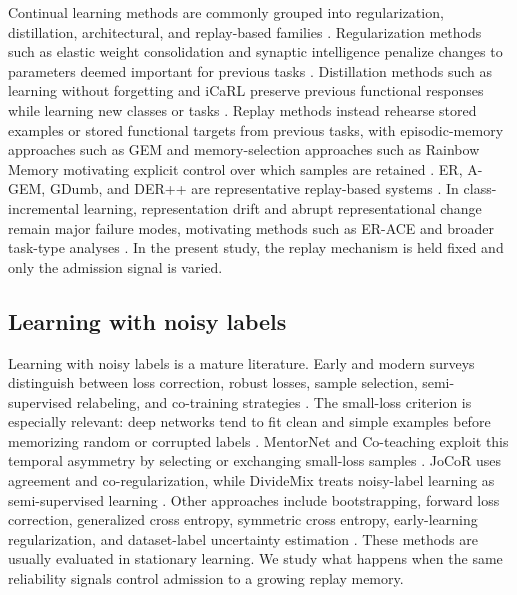 \documentclass[preprint,12pt]{elsarticle}
\begin{document}
Continual learning methods are commonly grouped into regularization, distillation, architectural, and replay-based families \cite{DeLange2022ContinualSurvey,Parisi2019ContinualReview,Wang2024ComprehensiveCLSurvey}. Regularization methods such as elastic weight consolidation and synaptic intelligence penalize changes to parameters deemed important for previous tasks \cite{Kirkpatrick2017EWC,Zenke2017SI}. Distillation methods such as learning without forgetting and iCaRL preserve previous functional responses while learning new classes or tasks \cite{Li2018LwF,Rebuffi2017iCaRL}. Replay methods instead rehearse stored examples or stored functional targets from previous tasks, with episodic-memory approaches such as GEM and memory-selection approaches such as Rainbow Memory motivating explicit control over which samples are retained \cite{LopezPaz2017GEM,Bang2021RainbowMemory}. ER, A-GEM, GDumb, and DER++ are representative replay-based systems \cite{Rolnick2019ExperienceReplay,Chaudhry2019AGEM,Prabhu2020GDumb,Buzzega2020DERPP}. In class-incremental learning, representation drift and abrupt representational change remain major failure modes, motivating methods such as ER-ACE and broader task-type analyses \cite{Caccia2022AbruptRepresentationChange,Masana2023ClassIncrementalSurvey,VanDeVen2022ThreeTypes}. In the present study, the replay mechanism is held fixed and only the admission signal is varied.

\subsection{Learning with noisy labels}

Learning with noisy labels is a mature literature. Early and modern surveys distinguish between loss correction, robust losses, sample selection, semi-supervised relabeling, and co-training strategies \cite{Frenay2014LabelNoiseSurvey,Algan2021NoisyLabelsSurvey,Song2023NoisyLabelsSurvey}. The small-loss criterion is especially relevant: deep networks tend to fit clean and simple examples before memorizing random or corrupted labels \cite{Arpit2017Memorization,Zhang2017Rethinking,Toneva2019ForgettingEvents}. MentorNet and Co-teaching exploit this temporal asymmetry by selecting or exchanging small-loss samples \cite{Jiang2018MentorNet,Han2018CoTeaching}. JoCoR uses agreement and co-regularization, while DivideMix treats noisy-label learning as semi-supervised learning \cite{Wei2020JoCoR,Li2020DivideMix}. Other approaches include bootstrapping, forward loss correction, generalized cross entropy, symmetric cross entropy, early-learning regularization, and dataset-label uncertainty estimation \cite{Reed2015Bootstrapping,Patrini2017LossCorrection,Zhang2018GCE,Wang2019SCE,Liu2020ELR,Northcutt2021ConfidentLearning}. These methods are usually evaluated in stationary learning. We study what happens when the same reliability signals control admission to a growing replay memory.
\end{document}
